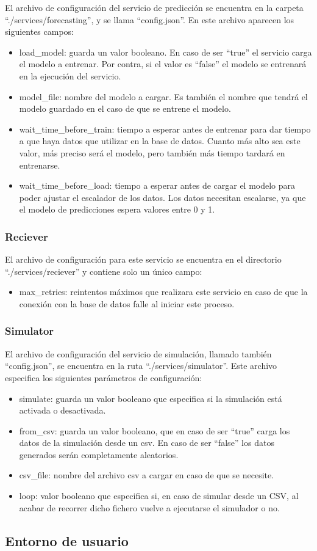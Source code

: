 El archivo de configuración del servicio de predicción se encuentra en la carpeta ``./services/forecasting'', y 
se llama ``config.json''. En este archivo aparecen los siguientes campos:
\begin{itemize}
    \item load\_model: guarda un valor booleano. En caso de ser ``true'' el servicio carga el modelo a entrenar.
        Por contra, si el valor es ``false'' el modelo se entrenará en la ejecución del servicio.
    \item model\_file: nombre del modelo a cargar. Es también el nombre que tendrá el modelo guardado en el caso 
        de que se entrene el modelo.
    \item wait\_time\_before\_train: tiempo a esperar antes de entrenar para dar tiempo a que haya datos que 
        utilizar en la base de datos. Cuanto más alto sea este valor, más preciso será el modelo, pero también
        más tiempo tardará en entrenarse.
    \item wait\_time\_before\_load: tiempo a esperar antes de cargar el modelo para poder ajustar el escalador de los
        datos. Los datos necesitan escalarse, ya que el modelo de predicciones espera valores entre 0 y 1.
\end{itemize}

\subsubsection{Reciever}

El archivo de configuración para este servicio se encuentra en el directorio ``./services/reciever'' y 
contiene solo un único campo:
\begin{itemize}
    \item max\_retries: reintentos máximos que realizara este servicio en caso de que la conexión con 
        la base de datos falle al iniciar este proceso.
\end{itemize}

\subsubsection{Simulator}

El archivo de configuración del servicio de simulación, llamado también ``config.json'', se encuentra en la 
ruta ``./services/simulator''. Este archivo especifica los siguientes parámetros de configuración:
\begin{itemize}
  \item simulate: guarda un valor booleano que especifica si la simulación está activada o desactivada.
  \item from\_csv: guarda un valor booleano, que en caso de ser ``true'' carga los datos de la simulación desde
    un csv. En caso de ser ``false'' los datos generados serán completamente aleatorios.
  \item csv\_file: nombre del archivo csv a cargar en caso de que se necesite.
  \item loop: valor booleano que especifica si, en caso de simular desde un CSV, al acabar de recorrer dicho fichero 
    vuelve a ejecutarse el simulador o no.
\end{itemize}

\subsection{Entorno de usuario}

